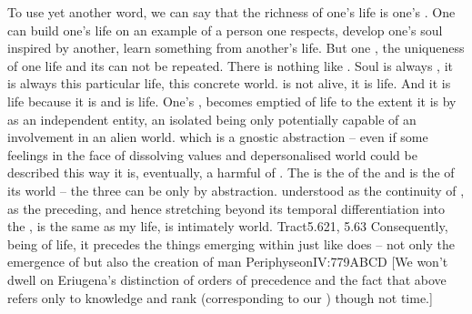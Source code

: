 \label{pa:worldislife1}
To use yet another word, we can say that the richness of {one's life} is one's
.  One can build {one's life} on an example of a person one respects,
develop one's soul inspired by another, learn something from another's life.
But one , the uniqueness of one life and its  can not be
repeated.  There is nothing like .  Soul is always
, it is always {this particular life}, this concrete {world}.
 is not alive, it is life.  And it is life because it is 
and  is life.  One's ,  becomes emptied of
life to the extent it is  by  as an independent
entity, an isolated being only potentially capable of an involvement in an alien
world.   which  is a gnostic abstraction
-- even if some feelings in the face of dissolving values and
depersonalised world  could be described this way it is,
eventually, a harmful  of .  The 
is the  of the  and is the  of its world -- the
three can be  only by  abstraction.  understood as the continuity of , as the 
preceding, and hence stretching beyond its temporal differentiation into the
, is the same as {my life}, is intimately  world.
\citet{The world and life are one.  I am my world.}{Tract}{5.621, 5.63}
Consequently,  being  of  life, it precedes the
things emerging within  just like  does -- not only
the emergence of  but also
the creation of man \citet{is prior to those things which were
  created with it or in it or below it.}{Periphyseon}{IV:779ABCD [We
  won't dwell on Eriugena's distinction of orders of precedence and the fact
  that  above refers only to knowledge and rank (corresponding to our
  ) though not time.]}
%


